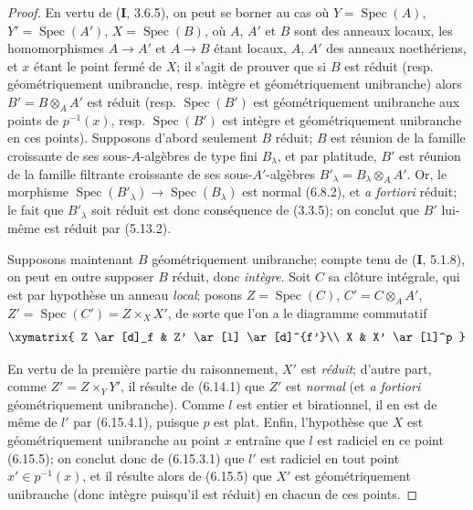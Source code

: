 \begin{proof}
En vertu de (\textbf{I}, 3.6.5), on peut se borner au cas où
$Y=\operatorname{Spec}(A)$, $Y'=\operatorname{Spec}(A')$,
$X=\operatorname{Spec}(B)$, où $A$, $A'$ et $B$ sont des anneaux locaux,
les homomorphismes $A\to A'$ et $A\to B$ étant locaux, $A$, $A'$ des
anneaux noethériens, et $x$ étant le point fermé de $X$; il s'agit de
prouver que si $B$ est réduit (resp. géométriquement unibranche, resp.
intègre et géométriquement unibranche) alors $B'=B\otimes_A A'$ est réduit
(resp. $\operatorname{Spec}(B')$ est géométriquement unibranche aux points
de $p^{-1}(x)$, resp. $\operatorname{Spec}(B')$ est intègre et
géométriquement unibranche en ces points). Supposons d'abord seulement
$B$ réduit; $B$ est réunion de la famille croissante de ses
sous-$A$-algèbres de type fini $B_\lambda$, et par platitude, $B'$ est
réunion de la famille filtrante croissante de ses sous-$A'$-algèbres
$B'_\lambda=B_\lambda\otimes_A A'$. Or, le morphisme
$\operatorname{Spec}(B'_\lambda)\to\operatorname{Spec}(B_\lambda)$ est
normal (6.8.2), et \emph{a fortiori} réduit; le fait que $B'_\lambda$ soit réduit
est donc conséquence de (3.3.5); on conclut que $B'$ lui-même est réduit par
(5.13.2).

Supposons maintenant $B$ géométriquement unibranche; compte tenu de (\textbf{I},
5.1.8), on peut en outre supposer $B$ réduit, donc \emph{intègre}. Soit $C$ sa
clôture intégrale, qui est par hypothèse un anneau \emph{local}; posons
$Z=\operatorname{Spec}(C)$, $C'=C\otimes_A A'$,
$Z'=\operatorname{Spec}(C')=Z\times_X X'$, de sorte que l'on a le diagramme
commutatif
\[
\xymatrix{
Z \ar[d]_f & Z' \ar[l] \ar[d]^{f'}\\
X & X' \ar[l]^p
}
\]

En vertu de la première partie du raisonnement, $X'$ est \emph{réduit}; d'autre
part, comme $Z'=Z\times_Y Y'$, il résulte de (6.14.1) que $Z'$ est \emph{normal}
(et \emph{a fortiori} géométriquement unibranche). Comme $l$ est entier et
birationnel, il en est de même de $l'$ par (6.15.4.1), puisque $p$ est
plat. Enfin, l'hypothèse que $X$ est géométriquement unibranche au point
$x$ entraîne que $l$ est radiciel en ce point (6.15.5); on conclut donc de
(6.15.3.1) que $l'$ est radiciel en tout point $x'\in p^{-1}(x)$, et il
résulte alors de (6.15.5) que $X'$ est géométriquement unibranche (donc
intègre puisqu'il est réduit) en chacun de ces points.
\end{proof}

